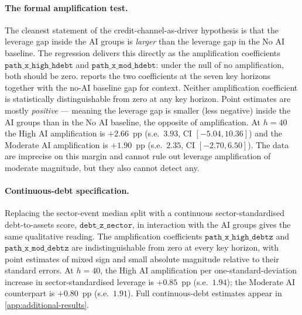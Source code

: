\paragraph{The formal amplification test.} The cleanest statement of
the credit-channel-as-driver hypothesis is that the leverage gap
inside the AI groups is \emph{larger} than the leverage gap in the
No AI baseline. The regression delivers this directly as the
amplification coefficients $\texttt{path\_x\_high\_hdebt}$ and
$\texttt{path\_x\_mod\_hdebt}$: under the null of no amplification,
both should be zero.  reports the
two coefficients at the seven key horizons together with the no-AI
baseline gap for context. Neither amplification coefficient is
statistically distinguishable from zero at any key horizon. Point
estimates are mostly \emph{positive} --- meaning the leverage gap is
smaller (less negative) inside the AI groups than in the No AI
baseline, the opposite of amplification. At $h = 40$ the High AI
amplification is $+2.66$~pp (s.e.~$3.93$, CI $[-5.04, 10.36]$) and
the Moderate AI amplification is $+1.90$~pp (s.e.~$2.35$, CI
$[-2.70, 6.50]$). The data are imprecise on this margin and cannot
rule out leverage amplification of moderate magnitude, but they
also cannot detect any.
 
\begin{table}[htbp]
\centering\small
\caption[Leverage amplification by AI group: key-horizon estimates]{Leverage
amplification by AI group: key-horizon estimates}
\label{tab:debt_amplification_key}

\end{table}
 
\paragraph{Continuous-debt specification.} Replacing the sector-event
median split with a continuous sector-standardised debt-to-assets
score, $\texttt{debt\_z\_sector}$, in interaction with the AI groups
gives the same qualitative reading. The amplification coefficients
$\texttt{path\_x\_high\_debtz}$ and $\texttt{path\_x\_mod\_debtz}$
are indistinguishable from zero at every key horizon, with point
estimates of mixed sign and small absolute magnitude relative to
their standard errors. At $h = 40$, the High AI amplification per
one-standard-deviation increase in sector-standardised leverage is
$+0.85$~pp (s.e.~$1.94$); the Moderate AI counterpart is $+0.80$~pp
(s.e.~$1.91$). Full continuous-debt estimates appear in
\cref{app:additional-results}.
 
